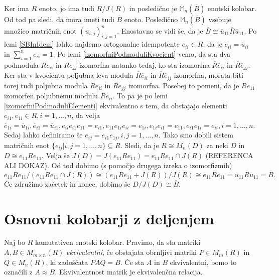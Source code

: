 \documentclass[a4paper, 12pt]{amsart}
\theoremstyle{definition} %
\theoremstyle{plain} %
\newcommand{\M}{\mathbb M}
\begin{document}
\proof
Ker ima $R$ enoto, jo ima tudi $R/J(R)$ in posledično je $\M_n(\overline{B})$ enotski kolobar. Od tod pa sledi, da mora imeti tudi $\overline{B}$ enoto. Posledično $\M_n(\overline{B})$ vsebuje množico matričnih enot $(u_{i,j})_{i,j=1}^n$. Enostavno se vidi še, da je $\overline{B}\cong \overline{u}_{11}\overline{R} \overline{u}_{11} $. Po lemi \ref{SBInIdem} lahko najdemo ortogonalne idempotente $e_{ii} \in R$, da je $\overline{e}_{ii} = \overline{u}_{ii}$ in $\sum_{i=1}^n e_{ii} = 1$. Po lemi \ref{izomorfniPodmoduliKvocient} vemo, da sta dva podmodula $Re_{ii}$ in $Re_{jj}$ izomorfna natanko tedaj, ko sta izomorfna $\overline{R} \overline{e}_{ii}$ in $\overline{R}\overline{e}_{jj}$. Ker sta v kvocientu poljubna leva modula $\overline{R} \overline{e}_{ii}$ in $\overline{R}\overline{e}_{jj}$ izomorfna, morata biti torej tudi poljubna modula $Re_{ii}$ in $Re_{jj}$ izomorfna. Posebej to pomeni, da je $Re_{11}$ izomorfen poljubnemu modulu $Re_{ii}$. To pa je po lemi \ref{izomorfniPodmoduliElementi} ekvivalentno s tem, da obstajajo elementi $e_{i1}, e_{1i}\in R, i=1,\dots,n$, da velja $\overline{e}_{1i} = \overline{u}_{1i}, \overline{e}_{i1} = \overline{u}_{i1}, e_{ii}e_{i1}e_{11} = e_{i1}, e_{11} e_{1i}e_{ii} = e_{1i}, e_{1i} e_{i1} = e_{11}, e_{i1} e_{1i} = e_{ii}, i = 1,\dots,n$. Sedaj lahko definiramo še $e_{ij} = e_{i1}e_{1j}, i, j = 1,\dots,n$. Tako smo dobili sistem matričnih enot $\{ e_{ij}|i,j=1,\dots,n\} \subseteq R$. Sledi, da je $R\cong M_n(D)$ za neki $D$ in $D\cong e_{11} R e_{11}$. Velja še $J(D) = J(e_{11} R e_{11}) = e_{11} R e_{11} \cap J(R)$ (REFERENCA ALI DOKAZ). Od tod dobimo (s pomočjo drugega izreka o izomorfizmih)
$$
e_{11}Re_{11} / (e_{11} R e_{11} \cap J(R)) \cong (e_{11} R e_{11} + J(R))/J(R) \cong \overline{e}_{11} \overline{R} \overline{e}_{11} = \overline{u}_{11} \overline{R} \overline{u}_{11} = \overline{B}.
$$
Če združimo začetek in konec, dobimo še $D/J(D) \cong \overline{B}$.
\endproof

\section{Osnovni kolobarji z deljenjem}

Naj bo $R$ komutativen enotski kolobar. Pravimo, da sta matriki $A,B\in M_{m\times n} (R)$ \emph{ekvivalentni}, če obstajata obrnljivi matriki $P\in M_m(R)$ in $Q\in M_n(R)$, ki zadoščata $PAQ = B$. Če sta $A$ in $B$ ekvivalentni, bomo to označili z $A \approx B$. Ekvivalentnost matrik je ekvivalenčna relacija.
\end{document}
